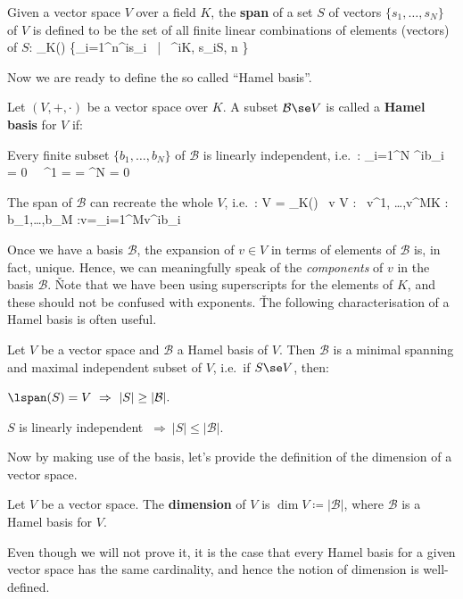 \bd [Span]
Given a vector space $V$ over a field $K$, the \textbf{span} of a set $S$ of vectors $\{s_1,\ldots,s_N\}$ of $V$ is
defined to be the set of all finite linear combinations of elements (vectors) of $S$:
\bse
\lspan_K() \coloneqq \bigg\{\sum_{i=1}^n\lambda^is_i \ \Big| \ \lambda^i\in K, s_i\in S, n \bigg\}
\ese
\ed

Now we are ready to define the so called ``Hamel basis''.

Let $(V,+,\cdot)$ be a vector space over $K$. A subset $\mathcal{B}\se V$ is called a \textbf{Hamel basis} for $V$ if:
\bit
\item Every finite subset $\{b_1,\ldots,b_N\}$ of $\mathcal{B}$ is linearly independent, i.e.\ :
\bse
\sum_{i=1}^N \lambda^ib_i = 0 \ \imp \ \lambda^1 = \cdots = \lambda^N = 0
\ese

\item The span of $\mathcal{B}$ can recreate the whole $V$, i.e.\ :
\bse
V = \lspan_K() \implies \forall \, v \in V : \exists \, v^1, \ldots,v^M\in K :
\exists \, b_1,\ldots,b_M \in {}:v=\ds \sum_{i=1}^Mv^ib_i
\ese
\eit
\ed

Once we have a basis $\mathcal{B}$, the expansion of $v\in V$ in terms of elements of $\mathcal{B}$ is, in fact,
unique. Hence, we can meaningfully speak of the \emph{components} of $v$ in the basis $\mathcal{B}$. \v

Note that we have been using superscripts for the elements of $K$, and these should not be confused with exponents. \v

The following characterisation of a Hamel basis is often useful.

\bt[]
Let $V$ be a vector space and $\mathcal{B}$ a Hamel basis of $V$. Then $\mathcal{B}$ is a minimal spanning and
maximal independent subset of $V$, i.e.\ if $S\se V$, then:
\bit \item $\lspan(S) = V\ \Rightarrow \ |S| \geq |\mathcal{B}|.$
\item $S$ is linearly independent $\ \Rightarrow\ |S| \leq |\mathcal{B}|.$
\eit
\et

Now by making use of the basis, let's provide the definition of the dimension of a vector space.

Let $V$ be a vector space. The \textbf{dimension} of $V$ is $\dim V \coloneqq |\mathcal{B}|$, where $\mathcal{B}$ is
a Hamel basis for $V$.
\ed

Even though we will not prove it, it is the case that every Hamel basis for a given vector space has the same
cardinality, and hence the notion of dimension is well-defined.

